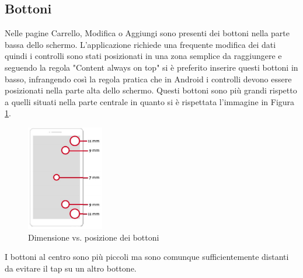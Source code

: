 \documentclass[12pt, a4paper, titlepage]{report}
\begin{document}
	\subsection{Bottoni}
	Nelle pagine Carrello, Modifica o Aggiungi sono presenti dei bottoni nella parte bassa dello schermo. L'applicazione richiede una frequente modifica dei dati quindi i controlli sono stati posizionati in una zona semplice da raggiungere e seguendo la regola "Content always on top" si è preferito inserire questi bottoni in basso, infrangendo così la regola pratica che in Android i controlli devono essere posizionati nella parte alta dello schermo. Questi bottoni sono più grandi rispetto a quelli situati nella parte centrale in quanto si è rispettata l'immagine in Figura \ref{fig:dimvspos}.
	\begin{figure}[H] 
		\centering
		\includegraphics[width=0.3\textwidth]{img/dimvspos}
		\caption{Dimensione vs. posizione dei bottoni}
		\label{fig:dimvspos}
	\end{figure}
	\noindent I bottoni al centro sono più piccoli ma sono comunque sufficientemente distanti da evitare il tap su un altro bottone.
	
\end{document}
